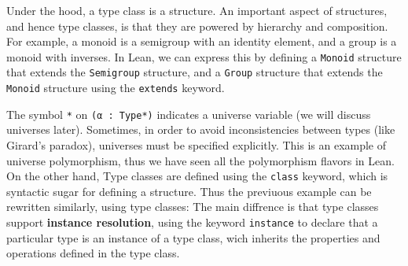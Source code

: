 Under the hood, a type class is a structure. An important aspect of structures,
and hence type classes, is that they are powered by hierarchy and composition.
For example, a monoid is a semigroup with an identity element, and a group is a monoid with inverses. In Lean, we can express this
by defining a \lstinline[language=lean]|Monoid| structure that extends 
the \lstinline[language=lean]|Semigroup| structure, 
and a \lstinline[language=lean]|Group| structure 
that extends the \lstinline[language=lean]|Monoid| structure
using the \lstinline[language=lean]|extends| keyword.


The symbol \lstinline[language=lean]|*| on  \lstinline[language=lean]|(α : Type*)| 
indicates a universe variable (we will discuss universes later). Sometimes, 
in order to avoid
inconsistencies between types (like Girard's paradox), universes must be specified explicitly. 
This is an example
of universe polymorphism, thus we have seen all the polymorphism flavors in Lean.
On the other hand, Type classes are defined using the \lstinline[language=lean]|class| keyword, 
which is syntactic sugar for defining a structure.
Thus the previuous example can be rewritten similarly, using type classes:
The main diffrence is that type classes support \textbf{instance resolution}, using the keyword 
\lstinline[language=lean]|instance| to declare that a particular type is an instance of a type class, 
wich inherits 
the properties and operations defined in the type class.

